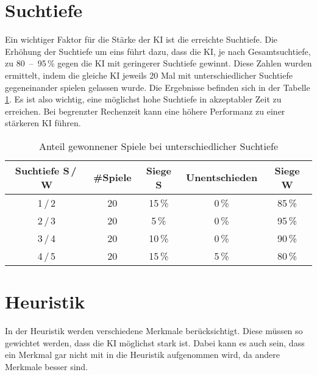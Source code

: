 
\section{Suchtiefe}
Ein wichtiger Faktor für die Stärke der KI ist die erreichte Suchtiefe.
Die Erhöhung der Suchtiefe um eins führt dazu, dass die KI, je nach Gesamtsuchtiefe, zu 80~–~95\,\% gegen die KI mit geringerer Suchtiefe gewinnt.
Diese Zahlen wurden ermittelt, indem die gleiche KI jeweils 20 Mal mit unterschiedlicher Suchtiefe gegeneinander spielen gelassen wurde.
Die Ergebnisse befinden sich in der Tabelle \ref{table:search-depth}.
Es ist also wichtig, eine möglichst hohe Suchtiefe in akzeptabler Zeit zu erreichen.
Bei begrenzter Rechenzeit kann eine höhere Performanz zu einer stärkeren KI führen.

\begin{table}[hb]
\centering
\begin{tabular}{c|c|ccc}
\hline
Suchtiefe S\,/\,W & \#Spiele & Siege S & Unentschieden & Siege W
\\ \hline
1\,/\,2 & 20 & 15\,\% &  0\,\% & 85\,\% \\
2\,/\,3 & 20 &  5\,\% &  0\,\% & 95\,\% \\
3\,/\,4 & 20 & 10\,\% &  0\,\% & 90\,\% \\
4\,/\,5 & 20 & 15\,\% &  5\,\% & 80\,\% \\
\hline
\end{tabular}
\caption{Anteil gewonnener Spiele bei unterschiedlicher Suchtiefe}
\label{table:search-depth}
\end{table}

\section{Heuristik}
In der Heuristik werden verschiedene Merkmale berücksichtigt. Diese müssen so gewichtet werden, dass die KI möglichst
stark ist. Dabei kann es auch sein, dass ein Merkmal gar nicht mit in die Heuristik aufgenommen wird, da andere Merkmale
besser sind.

